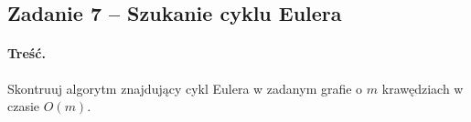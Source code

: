 \subsection{Zadanie 7 -- Szukanie cyklu Eulera}
\paragraph{Treść.} Skontruuj algorytm znajdujący cykl Eulera 
w zadanym grafie o $m$ krawędziach w czasie $O(m)$.

